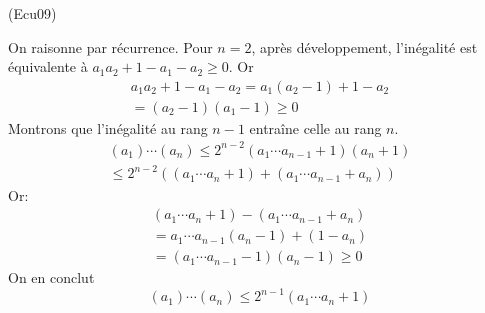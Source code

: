 \begin{tiny}(Ecu09)\end{tiny} On raisonne par récurrence.\newline
Pour $n=2$, après développement, l'inégalité est équivalente à $a_1a_2+1-a_1-a_2 \geq 0$. Or 
\begin{multline*}
 a_1a_2+1-a_1-a_2 = a_1(a_2 -1) + 1-a_2 \\ = (a_2-1)(a_1-1)\geq 0
\end{multline*}
Montrons que l'inégalité au rang $n-1$ entraîne celle au rang $n$.
\begin{multline*}
(a_1)\cdots (a_n) \leq 2^{n-2}(a_1\cdots a_{n-1} + 1)(a_n+1)\\
\leq 2^{n-2}\left( (a_1\cdots a_{n} + 1) + (a_1\cdots a_{n-1} + a_n)\right) 
\end{multline*}
Or:
\begin{multline*}
(a_1\cdots a_{n} + 1) - (a_1\cdots a_{n-1} + a_n)\\
= a_1\cdots a_{n-1}(a_n -1) + (1-a_n) \\
= (a_1\cdots a_{n-1} -1)(a_n -1)\geq 0
\end{multline*}
On en conclut
\begin{displaymath}
(a_1)\cdots (a_n) \leq 2^{n-1}(a_1\cdots a_{n} + 1)  
\end{displaymath}
